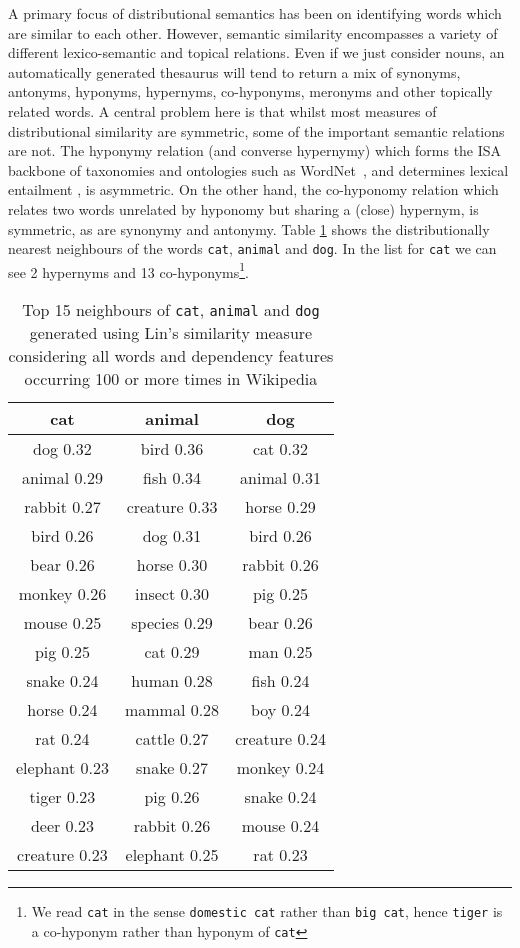\documentclass[11pt]{article}
\begin{document}
A primary focus of distributional semantics has been on identifying words which are similar to each other. However, semantic similarity encompasses a variety of different lexico-semantic and topical relations.  Even if we just consider nouns, an automatically generated thesaurus will tend to return a mix of synonyms, antonyms, hyponyms, hypernyms, co-hyponyms, meronyms and other topically related words.  A central problem here is that whilst most measures of distributional similarity are symmetric, some of the important semantic relations are not.  The hyponymy relation (and converse hypernymy) which forms the ISA backbone of taxonomies and ontologies such as WordNet~\cite{Fellbaum:98}, and determines lexical entailment \cite{Geffet2005}, is asymmetric. On the other hand, the co-hyponomy relation which relates two words unrelated by hyponomy but sharing a (close) hypernym, is symmetric, as are synonymy and antonymy. Table \ref{table:neighbours} shows the distributionally nearest neighbours of the words \texttt{cat}, \texttt{animal} and \texttt{dog}. %
In the list for \texttt{cat} we can see 2 hypernyms and 13 co-hyponyms\footnote{We read \texttt{cat} in the sense \texttt{domestic cat} rather than \texttt{big cat}, hence \texttt{tiger} is a co-hyponym rather than hyponym of \texttt{cat}}. 

\begin{table}[th]
\begin{tabular}{|c|c|c|}
\hline
cat&animal&dog\\
\hline
dog 0.32&bird 0.36&cat 0.32\\
animal 0.29&fish 0.34&animal 0.31\\
rabbit 0.27&creature 0.33&horse 0.29\\
bird 0.26&dog 0.31&bird 0.26\\
bear 0.26&horse 0.30&rabbit 0.26\\
monkey 0.26&insect 0.30&pig 0.25\\
mouse 0.25&species 0.29&bear 0.26\\
pig 0.25&cat 0.29&man 0.25\\
snake 0.24&human 0.28&fish 0.24\\
horse 0.24&mammal 0.28&boy 0.24\\
rat 0.24&cattle 0.27&creature 0.24\\
elephant 0.23&snake 0.27&monkey 0.24\\
tiger 0.23&pig 0.26&snake 0.24\\
deer 0.23&rabbit 0.26&mouse 0.24\\
creature 0.23&elephant 0.25&rat 0.23\\
\hline
\end{tabular}
\label{table:neighbours}
\caption{Top 15 neighbours of \texttt{cat}, \texttt{animal} and \texttt{dog} generated using Lin's similarity measure \cite{Lin1998} considering all words and dependency features occurring 100 or more times in Wikipedia}
\end{table}
\end{document}
